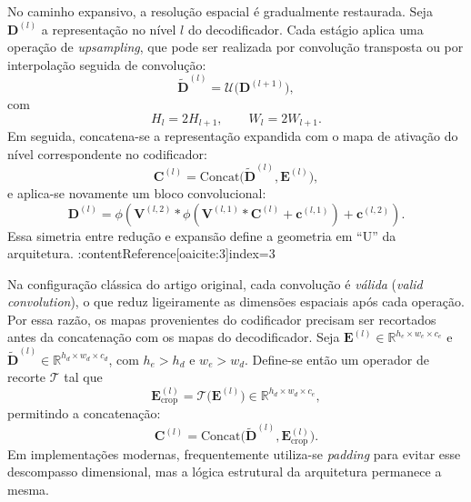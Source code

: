 \documentclass[tcc,capa]{texufpel}
\begin{document}
No caminho expansivo, a resolução espacial é gradualmente restaurada. Seja \(\mathbf{D}^{(l)}\) a representação no nível \(l\) do decodificador. Cada estágio aplica uma operação de \textit{upsampling}, que pode ser realizada por convolução transposta ou por interpolação seguida de convolução:
\begin{equation}
	\tilde{\mathbf{D}}^{(l)} = \mathcal{U}\big(\mathbf{D}^{(l+1)}\big),
\end{equation}
com
\begin{equation}
	H_l = 2H_{l+1}, \qquad
	W_l = 2W_{l+1}.
\end{equation}
Em seguida, concatena-se a representação expandida com o mapa de ativação do nível correspondente no codificador:
\begin{equation}
	\mathbf{C}^{(l)} = \mathrm{Concat}\big(\tilde{\mathbf{D}}^{(l)}, \mathbf{E}^{(l)}\big),
\end{equation}
e aplica-se novamente um bloco convolucional:
\begin{equation}
	\mathbf{D}^{(l)} = \phi\!\left(\mathbf{V}^{(l,2)} * \phi\!\left(\mathbf{V}^{(l,1)} * \mathbf{C}^{(l)} + \mathbf{c}^{(l,1)}\right) + \mathbf{c}^{(l,2)}\right).
\end{equation}
Essa simetria entre redução e expansão define a geometria em ``U'' da arquitetura. :contentReference[oaicite:3]{index=3}

Na configuração clássica do artigo original, cada convolução é \emph{válida} (\textit{valid convolution}), o que reduz ligeiramente as dimensões espaciais após cada operação. Por essa razão, os mapas provenientes do codificador precisam ser recortados antes da concatenação com os mapas do decodificador. Seja \(\mathbf{E}^{(l)} \in \mathbb{R}^{h_e \times w_e \times c_e}\) e \(\tilde{\mathbf{D}}^{(l)} \in \mathbb{R}^{h_d \times w_d \times c_d}\), com \(h_e > h_d\) e \(w_e > w_d\). Define-se então um operador de recorte \(\mathcal{T}\) tal que
\begin{equation}
	\mathbf{E}_{\text{crop}}^{(l)} = \mathcal{T}\big(\mathbf{E}^{(l)}\big) \in \mathbb{R}^{h_d \times w_d \times c_e},
\end{equation}
permitindo a concatenação:
\begin{equation}
	\mathbf{C}^{(l)} = \mathrm{Concat}\big(\tilde{\mathbf{D}}^{(l)}, \mathbf{E}_{\text{crop}}^{(l)}\big).
\end{equation}
Em implementações modernas, frequentemente utiliza-se \textit{padding} para evitar esse descompasso dimensional, mas a lógica estrutural da arquitetura permanece a mesma.
\end{document}
